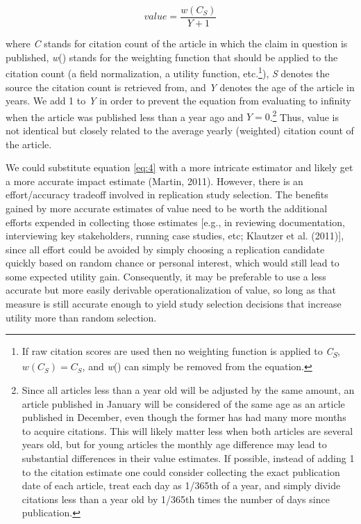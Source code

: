 \documentclass[
  english,
  man,floatsintext]{apa6}
\begin{document}
\begin{equation} 
  \tag{4}
  value=\frac{w(C_{S})}{Y+1}
  \label{eq:4}
\end{equation}

where \emph{C} stands for citation count of the article in which the claim in question is published, \emph{w}() stands for the weighting function that should be applied to the citation count (a field normalization, a utility function, etc.\footnote{If raw citation scores are used then no weighting function is applied to \emph{C\textsubscript{S}}, \(w(C_{S}) = C_{S}\), and \emph{w}() can simply be removed from the equation.}), \emph{S} denotes the source the citation count is retrieved from, and \emph{Y} denotes the age of the article in years. We add 1 to \emph{Y} in order to prevent the equation from evaluating to infinity when the article was published less than a year ago and \(Y=0\).\footnote{Since all articles less than a year old will be adjusted by the same amount, an article published in January will be considered of the same age as an article published in December, even though the former has had many more months to acquire citations. This will likely matter less when both articles are several years old, but for young articles the monthly age difference may lead to substantial differences in their value estimates. If possible, instead of adding 1 to the citation estimate one could consider collecting the exact publication date of each article, treat each day as 1/365th of a year, and simply divide citations less than a year old by 1/365th times the number of days since publication.} Thus, value is not identical but closely related to the average yearly (weighted) citation count of the article.

We could substitute equation \eqref{eq:4} with a more intricate estimator and likely get a more accurate impact estimate (Martin, 2011). However, there is an effort/accuracy tradeoff involved in replication study selection. The benefits gained by more accurate estimates of value need to be worth the additional efforts expended in collecting those estimates {[}e.g., in reviewing documentation, interviewing key stakeholders, running case studies, etc; Klautzer et al. (2011){]}, since all effort could be avoided by simply choosing a replication candidate quickly based on random chance or personal interest, which would still lead to some expected utility gain. Consequently, it may be preferable to use a less accurate but more easily derivable operationalization of value, so long as that measure is still accurate enough to yield study selection decisions that increase utility more than random selection.
\end{document}
